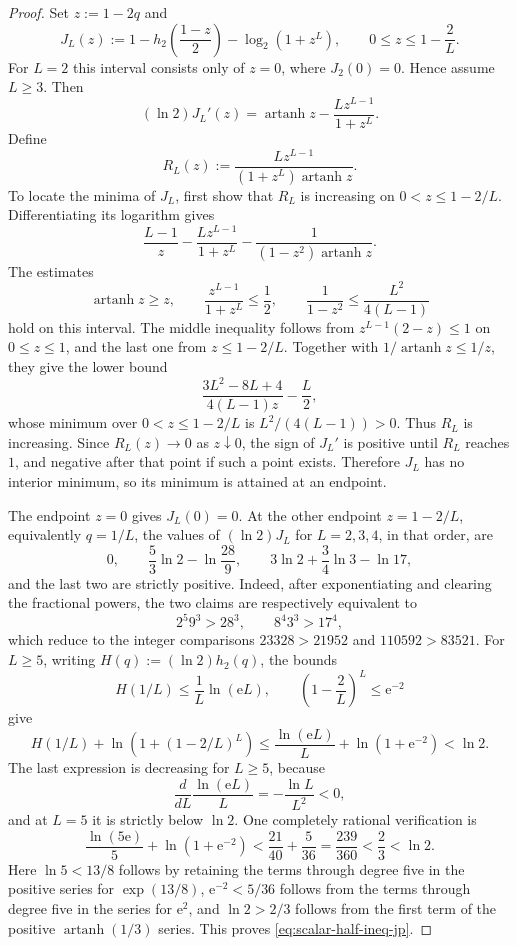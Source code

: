 \documentclass[11pt]{article}
\theoremstyle{definition}
\newcommand{\h}{h_2}
\begin{document}
\begin{proof}
Set \(z:=1-2q\) and
\[
J_L(z):=1-\h\!\left(\frac{1-z}{2}\right)-\log_2(1+z^L),
\qquad
0\le z\le 1-\frac2L.
\]
For \(L=2\) this interval consists only of \(z=0\), where \(J_2(0)=0\).
Hence assume \(L\ge3\). Then
\[
(\ln2)J_L'(z)
=
\operatorname{artanh}z-\frac{Lz^{L-1}}{1+z^L}.
\]
Define
\[
R_L(z):=
\frac{Lz^{L-1}}{(1+z^L)\operatorname{artanh}z}.
\]
To locate the minima of \(J_L\), first show that \(R_L\) is increasing on
\(0<z\le1-2/L\). Differentiating its logarithm gives
\[
\frac{L-1}{z}
-\frac{Lz^{L-1}}{1+z^L}
-\frac{1}{(1-z^2)\operatorname{artanh}z}.
\]
The estimates
\[
\operatorname{artanh}z\ge z,
\qquad
\frac{z^{L-1}}{1+z^L}\le\frac12,
\qquad
\frac{1}{1-z^2}\le \frac{L^2}{4(L-1)}
\]
hold on this interval. The middle inequality follows from
\(z^{L-1}(2-z)\le1\) on \(0\le z\le1\), and the last one from
\(z\le1-2/L\). Together with \(1/\operatorname{artanh}z\le1/z\), they give
the lower bound
\[
\frac{3L^2-8L+4}{4(L-1)z}-\frac{L}{2},
\]
whose minimum over \(0<z\le1-2/L\) is \(L^2/(4(L-1))>0\).
Thus \(R_L\) is increasing. Since \(R_L(z)\to0\) as \(z\downarrow0\),
the sign of \(J_L'\) is positive until \(R_L\) reaches \(1\), and negative
after that point if such a point exists. Therefore \(J_L\) has no interior
minimum, so its minimum is attained at an endpoint.

The endpoint \(z=0\) gives \(J_L(0)=0\). At the other endpoint
\(z=1-2/L\), equivalently \(q=1/L\), the values of \((\ln2)J_L\) for
\(L=2,3,4\), in that order, are
\[
0,
\qquad
\frac53\ln2-\ln\frac{28}{9},
\qquad
3\ln2+\frac34\ln3-\ln17,
\]
and the last two are strictly positive.  Indeed, after exponentiating
and clearing the fractional powers, the two claims are respectively
equivalent to
\[
2^5 9^3>28^3,
\qquad
8^4 3^3>17^4,
\]
which reduce to the integer comparisons \(23328>21952\) and
\(110592>83521\). For \(L\ge5\), writing
\(H(q):=(\ln2)\h(q)\), the bounds
\[
H(1/L)\le \frac1L\ln(\mathrm{e}L),
\qquad
\left(1-\frac2L\right)^L\le \mathrm{e}^{-2}
\]
give
\[
H(1/L)+\ln(1+(1-2/L)^L)
\le
\frac{\ln(\mathrm{e}L)}{L}+\ln(1+\mathrm{e}^{-2})
<\ln2.
\]
The last expression is decreasing for \(L\ge5\), because
\[
\frac{d}{dL}\frac{\ln(\mathrm{e}L)}{L}
=-\frac{\ln L}{L^2}<0,
\]
and at \(L=5\) it is strictly below \(\ln2\).  One completely rational
verification is
\[
\frac{\ln(5\mathrm e)}5+\ln(1+\mathrm e^{-2})
<\frac{21}{40}+\frac5{36}
=\frac{239}{360}<\frac23<\ln2.
\]
Here \(\ln5<13/8\) follows by retaining the terms through degree five
in the positive series for \(\exp(13/8)\), \(\mathrm e^{-2}<5/36\)
follows from the terms through degree five in the series for
\(\mathrm e^2\), and \(\ln2>2/3\) follows from the first term of the
positive \(\operatorname{artanh}(1/3)\) series. This proves
\eqref{eq:scalar-half-ineq-jp}.
\end{proof}
\end{document}
